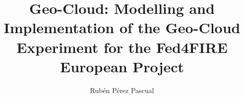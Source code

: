 \title{Geo-Cloud: Modelling and Implementation of the Geo-Cloud Experiment for the Fed4FIRE European Project}
\author{Rubén Pérez Pascual}{}







